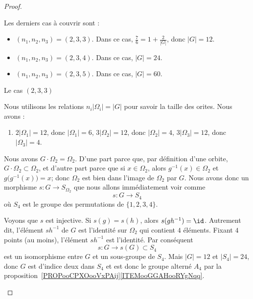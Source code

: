 \begin{proof}
\begin{subproof}
                Les derniers cas à couvrir sont :
                \begin{itemize}
                    \item \( (n_1,n_2,n_3)=(2,3,3)\). Dans ce cas, \( \frac{ 7 }{ 6 }=1+\frac{ 2 }{ | G | }\), donc \( | G |=12\).
                    \item \( (n_1,n_2,n_3)=(2,3,4)\). Dans ce cas, \( | G |=24\).
                    \item \( (n_1,n_2,n_3)=(2,3,5)\). Dans ce cas, \( | G |=60\).
                \end{itemize}

            \item[Le cas \( (2,3,3)\)]

                Nous utilisons les relations \( n_i| \Omega_i |=| G |\) pour savoir la taille des orites. Nous avons :
                \begin{enumerate}
                    \item
                        \( 2| \Omega_1 |=12\), donc \( | \Omega_1 |=6\),
                        \( 3| \Omega_2 |=12\), donc \( | \Omega_2 |=4\),
                        \( 3| \Omega_3 |=12\), donc \( | \Omega_3 |=4\).
                \end{enumerate}

                Nous avons \( G\cdot \Omega_2=\Omega_2\). D'une part parce que, par définition d'une orbite, \( G\cdot\Omega_2\subset\Omega_2\), et d'autre part parce que si \( x\in\Omega_2\), alors \( g^{-1}(x)\in\Omega_2\) et \( g\big( g^{-1}(x) \big)=x\); donc \( \Omega_2\) est bien dans l'image de \( \Omega_2\) par \( G\). Nous avons donc un morphisme \( s\colon G\to S_{\Omega_2}\) que nous allons immédiatement voir comme
                \begin{equation}
                    s\colon G\to S_4
                \end{equation}
                où \( S_4\) est le groupe des permutations de \( \{ 1,2,3,4 \}\).

                Voyons que \( s\) est injective. Si \( s(g)=s(h)\), alors \( s(gh^{-1})=\id\). Autrement dit, l'élément \( sh^{-1}\) de \( G\) est l'identité sur \( \Omega_2\) qui contient \( 4\) éléments. Fixant \( 4\) points (au moins), l'élément \( sh^{-1}\) est l'identité. Par conséquent
                \begin{equation}
                    s\colon G\to s(G)\subset S_4
                \end{equation}
                est un isomorphisme entre \( G\) et un sous-groupe de \( S_4\). Mais \( | G |=12\) et \( | S_4 |=24\), donc \( G\) est d'indice deux dans \( S_4\) et est donc le groupe alterné \( A_4\) par la proposition~\ref{PROPooCPXOooVxPAij}\ref{ITEMooGGAHooRYgNqq}.


\end{subproof}
\end{proof}
